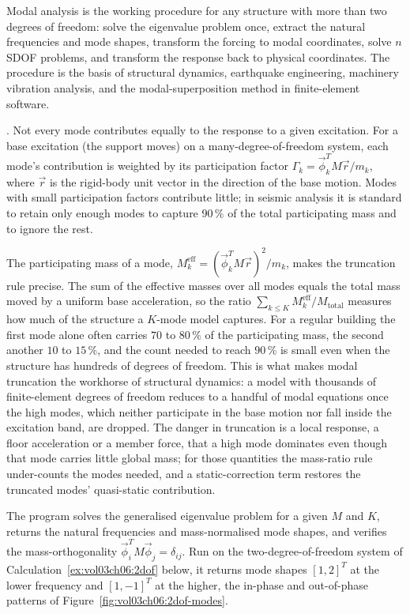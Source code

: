 

Modal analysis is the working procedure for any structure with more
than two degrees of freedom: solve the eigenvalue problem once,
extract the natural frequencies and mode shapes, transform the
forcing to modal coordinates, solve $n$ SDOF problems, and transform
the response back to physical coordinates. The procedure is the basis
of structural dynamics, earthquake engineering, machinery vibration
analysis, and the modal-superposition method in finite-element
software.

. Not every mode contributes equally
to the response to a given excitation. For a base excitation (the
support moves) on a many-degree-of-freedom system, each mode's
contribution is weighted by its participation factor $\Gamma_k =
\vec{\phi}_k^T M \vec{r} / m_k$, where $\vec{r}$ is the rigid-body
unit vector in the direction of the base motion. Modes with small
participation factors contribute little; in seismic analysis it is
standard to retain only enough modes to capture $90\,\%$ of the
total participating mass and to ignore the rest.

The participating mass of a mode, $M_k^{\text{eff}} = (\vec\phi_k^T M
\vec r)^2/m_k$, makes the truncation rule precise. The sum of the
effective masses over all modes equals the total mass moved by a uniform
base acceleration, so the ratio $\sum_{k\le K} M_k^{\text{eff}}/M_{
\text{total}}$ measures how much of the structure a $K$-mode model
captures. For a regular building the first mode alone often carries
$70$ to $80\,\%$ of the participating mass, the second another $10$ to
$15\,\%$, and the count needed to reach $90\,\%$ is small even when the
structure has hundreds of degrees of freedom. This is what makes modal
truncation the workhorse of structural dynamics: a model with thousands
of finite-element degrees of freedom reduces to a handful of modal
equations once the high modes, which neither participate in the base
motion nor fall inside the excitation band, are dropped. The danger in
truncation is a local response, a floor acceleration or a member force,
that a high mode dominates even though that mode carries little global
mass; for those quantities the mass-ratio rule under-counts the modes
needed, and a static-correction term restores the truncated modes'
quasi-static contribution.

The program  solves the generalised
eigenvalue problem for a given $M$ and $K$, returns the natural
frequencies and mass-normalised mode shapes, and verifies the
mass-orthogonality $\vec{\phi}_i^T M \vec{\phi}_j = \delta_{ij}$. Run
on the two-degree-of-freedom system of Calculation~\ref{ex:vol03ch06:2dof}
below, it returns mode shapes $[1, 2]^T$ at the lower frequency and
$[1, -1]^T$ at the higher, the in-phase and out-of-phase patterns of
Figure~\ref{fig:vol03ch06:2dof-modes}.

